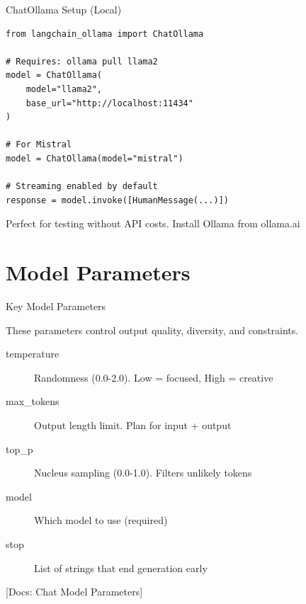 \documentclass[aspectratio=169,11pt]{beamer}
\newcommand{\docref}[1]{{\scriptsize\color{docgray}[Docs: #1]}}
\begin{document}
\begin{frame}[fragile]{ChatOllama Setup (Local)}
  \begin{codebox}
    \begin{lstlisting}
from langchain_ollama import ChatOllama

# Requires: ollama pull llama2
model = ChatOllama(
    model="llama2",
    base_url="http://localhost:11434"
)

# For Mistral
model = ChatOllama(model="mistral")

# Streaming enabled by default
response = model.invoke([HumanMessage(...)])
    \end{lstlisting}
  \end{codebox}

  \begin{tipbox}
    Perfect for testing without API costs. Install Ollama from ollama.ai
  \end{tipbox}
\end{frame}

\section{Model Parameters}

\begin{frame}{Key Model Parameters}
  \begin{conceptbox}
    These parameters control output quality, diversity, and constraints.
  \end{conceptbox}

  \begin{description}
    \item[temperature] Randomness (0.0-2.0). Low = focused, High = creative
    \item[max\_tokens] Output length limit. Plan for input + output
    \item[top\_p] Nucleus sampling (0.0-1.0). Filters unlikely tokens
    \item[model] Which model to use (required)
    \item[stop] List of strings that end generation early
  \end{description}

  \docref{Chat Model Parameters}
\end{frame}
\end{document}
